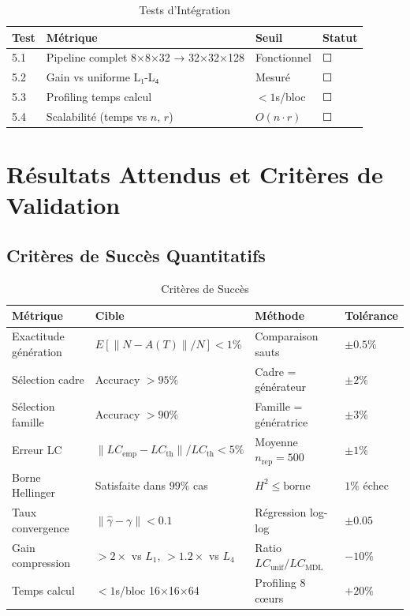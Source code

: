 \documentclass[12pt,a4paper]{article}
\begin{document}
	\begin{table}[h]
		\centering
		\caption{Tests d'Intégration}
		\label{tab:tests_integration}
		\begin{tabular}{@{}llll@{}}
			\toprule
			\textbf{Test} & \textbf{Métrique} & \textbf{Seuil} & \textbf{Statut} \\
			\midrule
			5.1 & Pipeline complet 8×8×32 → 32×32×128 & Fonctionnel & ☐ \\
			5.2 & Gain vs uniforme L₁-L₄ & Mesuré & ☐ \\
			5.3 & Profiling temps calcul & $< 1$s/bloc & ☐ \\
			5.4 & Scalabilité (temps vs $n$, $r$) & $O(n \cdot r)$ & ☐ \\
			\bottomrule
		\end{tabular}
	\end{table}
	
	\section{Résultats Attendus et Critères de Validation}
	\label{sec:resultats_attendus}
	
	\subsection{Critères de Succès Quantitatifs}
	\label{subsec:criteres_succes}
	
	\begin{table}[h]
		\centering
		\caption{Critères de Succès}
		\label{tab:criteres_succes}
		\begin{tabular}{@{}llll@{}}
			\toprule
			\textbf{Métrique} & \textbf{Cible} & \textbf{Méthode} & \textbf{Tolérance} \\
			\midrule
			Exactitude génération & $E[\|N - A(T)\|/N] < 1\%$ & Comparaison sauts & $\pm 0.5\%$ \\
			Sélection cadre & Accuracy $> 95\%$ & Cadre = générateur & $\pm 2\%$ \\
			Sélection famille & Accuracy $> 90\%$ & Famille = génératrice & $\pm 3\%$ \\
			Erreur LC & $\|LC_{\text{emp}} - LC_{\text{th}}\|/LC_{\text{th}} < 5\%$ & Moyenne $n_{\text{rep}}=500$ & $\pm 1\%$ \\
			Borne Hellinger & Satisfaite dans $99\%$ cas & $H^2 \leq \text{borne}$ & $1\%$ échec \\
			Taux convergence & $\|\hat{\gamma} - \gamma\| < 0.1$ & Régression log-log & $\pm 0.05$ \\
			Gain compression & $> 2\times$ vs $L_1$, $> 1.2\times$ vs $L_4$ & Ratio $LC_{\text{unif}}/LC_{\text{MDL}}$ & $-10\%$ \\
			Temps calcul & $< 1$s/bloc 16×16×64 & Profiling 8 cœurs & $+20\%$ \\
			\bottomrule
		\end{tabular}
	\end{table}
	
\end{document}
